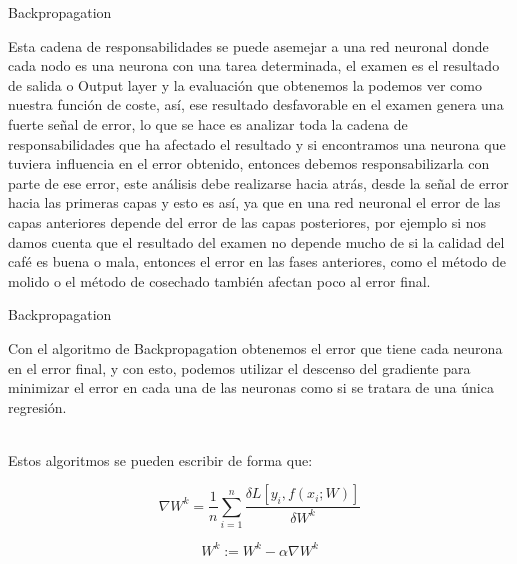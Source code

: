 \documentclass[10pt]{beamer}
\begin{document}
\begin{frame}{Backpropagation}

Esta cadena de responsabilidades se puede asemejar a una red neuronal donde cada nodo es una neurona con una tarea determinada, el examen es el resultado de salida o Output layer y la evaluación que obtenemos la podemos ver como nuestra función de coste, así, ese resultado desfavorable en el examen genera una fuerte señal de error, lo que se hace es analizar toda la cadena de responsabilidades que ha afectado el resultado y si encontramos una neurona que tuviera influencia en el error obtenido, entonces debemos responsabilizarla con parte de ese error, este análisis debe realizarse hacia atrás, desde la señal de error hacia las primeras capas y esto es así, ya que en una red neuronal el error de las capas anteriores depende del error de las capas posteriores, por ejemplo si nos damos cuenta que el resultado del examen no depende mucho de si la calidad del café es buena o mala, entonces el error en las fases anteriores, como el método de molido o el método de cosechado también afectan poco al error final. 

\end{frame}

\begin{frame}{Backpropagation}

Con el algoritmo de Backpropagation obtenemos el error que tiene cada neurona en el error final, y con esto, podemos utilizar el descenso del gradiente para minimizar el error en cada una de las neuronas como si se tratara de una única regresión.

~\\Estos algoritmos se pueden escribir de forma que:

$$\nabla W^{k}=\frac{1}{n}\sum_{i=1}^{n}\frac{\delta L[y_i,f(x_i;W)]}{\delta W^{k}}$$

$$W^{k}:=W^{k}-\alpha\nabla W^{k}$$
\end{frame}
\end{document}

